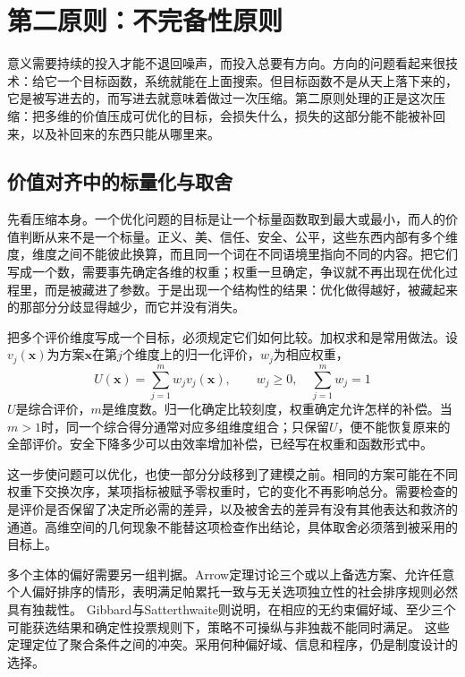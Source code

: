 \section{第二原则：不完备性原则}

意义需要持续的投入才能不退回噪声，而投入总要有方向。方向的问题看起来很技术：给它一个目标函数，系统就能在上面搜索。但目标函数不是从天上落下来的，它是被写进去的，而写进去就意味着做过一次压缩。第二原则处理的正是这次压缩：把多维的价值压成可优化的目标，会损失什么，损失的这部分能不能被补回来，以及补回来的东西只能从哪里来。

\subsection{价值对齐中的标量化与取舍}

先看压缩本身。一个优化问题的目标是让一个标量函数取到最大或最小，而人的价值判断从来不是一个标量。正义、美、信任、安全、公平，这些东西内部有多个维度，维度之间不能彼此换算，而且同一个词在不同语境里指向不同的内容。把它们写成一个数，需要事先确定各维的权重；权重一旦确定，争议就不再出现在优化过程里，而是被藏进了参数。于是出现一个结构性的结果：优化做得越好，被藏起来的那部分分歧显得越少，而它并没有消失。


把多个评价维度写成一个目标，必须规定它们如何比较。加权求和是常用做法。设$v_j(\mathbf x)$为方案$\mathbf x$在第$j$个维度上的归一化评价，$w_j$为相应权重，
\begin{equation}
U(\mathbf x)=\sum_{j=1}^{m}w_jv_j(\mathbf x),\qquad w_j\ge0,\quad \sum_{j=1}^{m}w_j=1
\end{equation}
$U$是综合评价，$m$是维度数。归一化确定比较刻度，权重确定允许怎样的补偿。当$m>1$时，同一个综合得分通常对应多组维度组合；只保留$U$，便不能恢复原来的全部评价。安全下降多少可以由效率增加补偿，已经写在权重和函数形式中。

这一步使问题可以优化，也使一部分分歧移到了建模之前。相同的方案可能在不同权重下交换次序，某项指标被赋予零权重时，它的变化不再影响总分。需要检查的是评价是否保留了决定所必需的差异，以及被舍去的差异有没有其他表达和救济的通道。高维空间的几何现象不能替这项检查作出结论，具体取舍必须落到被采用的目标上。


多个主体的偏好需要另一组判据。Arrow定理讨论三个或以上备选方案、允许任意个人偏好排序的情形，表明满足帕累托一致与无关选项独立性的社会排序规则必然具有独裁性。\cite{arrow1951social} Gibbard与Satterthwaite则说明，在相应的无约束偏好域、至少三个可能获选结果和确定性投票规则下，策略不可操纵与非独裁不能同时满足。\cite{gibbard1973manipulation,satterthwaite1975strategy} 这些定理定位了聚合条件之间的冲突。采用何种偏好域、信息和程序，仍是制度设计的选择。


